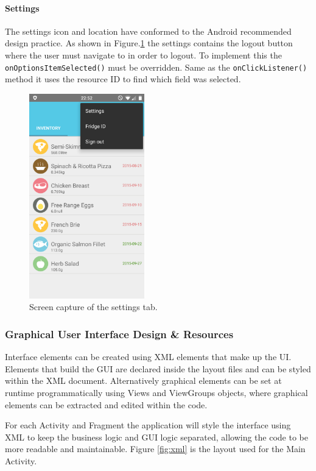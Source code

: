 \documentclass[a4paper, 11pt]{article}
\begin{document}
\paragraph{Settings} 
The settings icon and location have conformed to the Android recommended design practice. As shown in Figure.\ref{fig:settings} the settings contains the logout button where the user must navigate to in order to logout. To implement this the \texttt{onOptionsItemSelected()} must be overridden. Same as the \texttt{onClickListener()} method it uses the resource ID to find which field was selected. 

\begin{figure}[!htbp]
\centering
\includegraphics[width=5cm]{settings}
\caption{Screen capture of the settings tab.} \label{fig:settings}
\end{figure}

\vspace{\baselineskip}

\subsubsection{Graphical User Interface Design \& Resources}
Interface elements can be created using XML elements that make up the UI. Elements that build the GUI are declared inside the layout files and can be styled within the XML document. Alternatively graphical elements can be set at runtime programmatically using Views and ViewGroups objects, where graphical elements can be extracted and edited within the code. 

For each Activity and Fragment the application will style the interface using XML to keep the business logic and GUI logic separated, allowing the code to be more readable and maintainable. Figure \ref{fig:xml} is the layout used for the Main Activity. 
\end{document}
